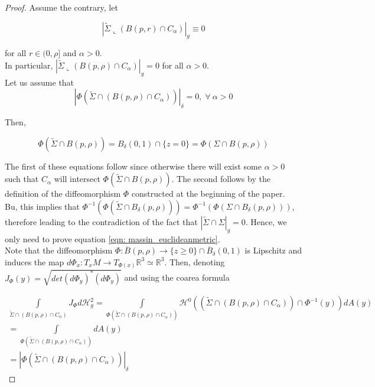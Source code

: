 \documentclass{amsart}
\newcommand{\hm}{\mathscr{H}}
\newcommand{\ts}{\tilde{\Sigma}}
\theoremstyle{named}
\begin{document}
\begin{proof}
    Assume the contrary, let

        \begin{equation} \nonumber
            |\ts \llcorner (B(p,r) \cap C_{\alpha})|_g \equiv 0
        \end{equation}

        for all $r \in (0,\rho]$ and $\alpha > 0$. \\ 

        In particular, $|\ts \llcorner (B(p,\rho) \cap C_{\alpha})|_g = 0$ for all $\alpha > 0$.\\

        Let us assume that 
        \begin{equation} \label{eqn: massin_euclideanmetric}
            |\Phi(\ts \cap (B(p,\rho) \cap C_{\alpha}))|_{\delta} = 0, \; \forall \: \alpha > 0
        \end{equation}
         
         Then,

        \begin{equation} \nonumber 
            \Phi(\ts \cap B(p,\rho)) = B_{\delta}(0,1) \cap \{ z=0 \} = \Phi(\Sigma \cap B(p,\rho))
        \end{equation}

        The first of these equations follow since otherwise there will exist some $\alpha > 0$ such that $C_{\alpha}$ will intersect $\Phi(\ts \cap B(p,\rho))$. The second follows by the definition of the diffeomorphism $\Phi$ constructed at the beginning of the paper. \\

        Bu, this implies that $\Phi^{-1}(\Phi(\ts \cap B_{\delta}(p,\rho))) = \Phi^{-1}(\Phi(\Sigma \cap B_{\delta}(p, \rho)))$, therefore leading to the contradiction of the fact that $|\ts \cap \Sigma|_g = 0$. Hence, we only need to prove equation \ref{eqn: massin_euclideanmetric}. \\ 

        Note that the diffeomorphism $\Phi: \overline{B}(p,\rho) \rightarrow \{ z \geq 0 \} \cap \overline{B}_{\delta}(0,1)$ is Lipschitz and induces the map $d\Phi_x: T_xM \rightarrow T_{\Phi(x)}\mathbb{R}^3 \simeq \mathbb{R}^3$. Then, denoting $J_{\Phi}(y) = \sqrt{det (d\Phi_y)^{*}(d\Phi_y)}$ and using the coarea formula

        \begin{gather*} 
            \int\limits_{\ts \cap (B(p,\rho) \cap C_{\alpha})} J_{\Phi} d\hm^{2}_g = \int\limits_{\Phi(\ts \cap (B(p,\rho) \cap C_{\alpha}))} \hm^{0}((\ts \cap (B(p,\rho) \cap C_{\alpha})) \cap \Phi^{-1}(y)) dA(y) \\ 
            = \int\limits_{\Phi(\ts \cap (B(p,\rho) \cap C_{\alpha}))} dA(y) \\ 
            = |\Phi(\ts \cap (B(p,\rho) \cap C_{\alpha}))|_{\delta}
        \end{gather*}


\end{proof}
\end{document}
